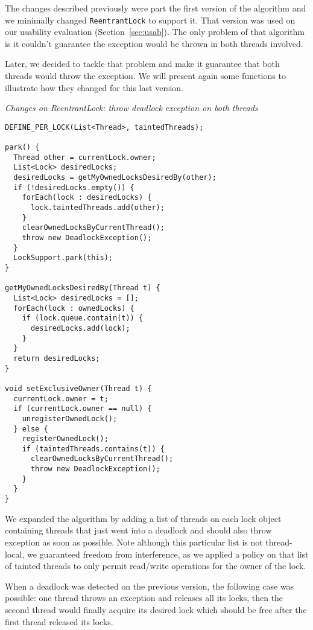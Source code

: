 The changes described previously were part the first version of the algorithm and we minimally changed  {\tt ReentrantLock} to support it.
That version was used on our usability evaluation (Section~\ref{sec:usab}).
The only problem of that algorithm is it couldn't guarantee the exception would be thrown in both threads involved.

Later, we decided to tackle that problem and make it guarantee that both threads would throw the exception.
We will present again some functions to illustrate how they changed for this last version.

\medskip
\noindent
{\it Changes on ReentrantLock: throw deadlock exception on both threads}
\begin{verbatim}
DEFINE_PER_LOCK(List<Thread>, taintedThreads);

park() {
  Thread other = currentLock.owner;
  List<Lock> desiredLocks;
  desiredLocks = getMyOwnedLocksDesiredBy(other);
  if (!desiredLocks.empty()) {
    forEach(lock : desiredLocks) {
      lock.taintedThreads.add(other);
    }
    clearOwnedLocksByCurrentThread();
    throw new DeadlockException();
  }
  LockSupport.park(this);
}

getMyOwnedLocksDesiredBy(Thread t) {
  List<Lock> desiredLocks = [];
  forEach(lock : ownedLocks) {
    if (lock.queue.contain(t)) {
      desiredLocks.add(lock);
    }
  }
  return desiredLocks;
}

void setExclusiveOwner(Thread t) {
  currentLock.owner = t;
  if (currentLock.owner == null) {
    unregisterOwnedLock();
  } else {
    registerOwnedLock();
    if (taintedThreads.contains(t)) {
      clearOwnedLocksByCurrentThread();
      throw new DeadlockException();
    }
  }
}

\end{verbatim}

We expanded the algorithm by adding a list of threads on each lock object containing threads that just went into a deadlock and should also throw exception as soon as possible.
Note although this particular list is not thread-local, we guaranteed freedom from interference,
as we applied a policy on that list of tainted threads to only permit read/write operations for the owner of the lock.

When a deadlock was detected on the previous version, the following case was possible:
one thread throws an exception and releases all its locks,
then the second thread would finally acquire its desired lock
which should be free after the first thread released its locks.

